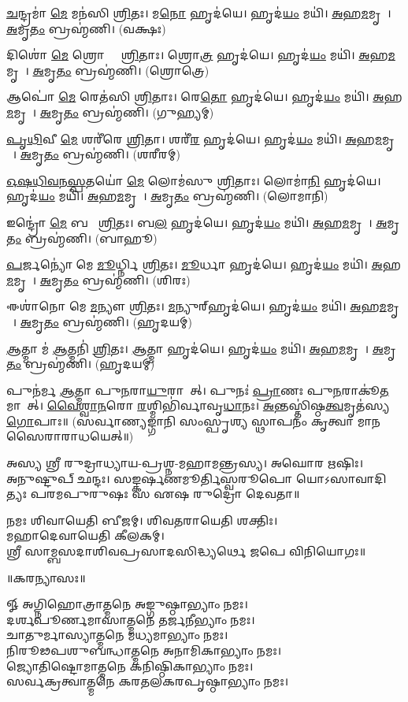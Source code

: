    \ul{𑌚}𑌨𑍍𑌦𑍍𑌰𑌮𑌾॑ \ul{𑌮𑍇} 𑌮𑌨॑𑌸𑌿 \ul{𑌶𑍍𑌰𑌿}𑌤𑌃।   𑌮\ul{𑌨𑍋} 𑌹𑍃𑌦॑𑌯𑍇।   𑌹𑍃𑌦॑\ul{𑌯𑌂} 𑌮𑌯𑌿॑।   \ul{𑌅}𑌹\ul{𑌮}𑌮𑍃𑌤𑍇᳚।   \ul{𑌅}𑌮𑍃\ul{𑌤𑌂} 𑌬𑍍𑌰𑌹𑍍𑌮॑𑌣𑌿। (𑌵𑌕𑍍𑌷𑌃)

   𑌦𑌿𑌶𑍋॑ \ul{𑌮𑍇} 𑌶𑍍𑌰𑍋𑌤𑍍𑌰𑍇᳚ \ul{𑌶𑍍𑌰𑌿}𑌤𑌾𑌃।   𑌶𑍍𑌰𑍋\ul{𑌤𑍍𑌰}\ul{} 𑌹𑍃𑌦॑𑌯𑍇।   𑌹𑍃𑌦॑\ul{𑌯𑌂} 𑌮𑌯𑌿॑।   \ul{𑌅}𑌹\ul{𑌮}𑌮𑍃𑌤𑍇᳚।   \ul{𑌅}𑌮𑍃\ul{𑌤𑌂} 𑌬𑍍𑌰𑌹𑍍𑌮॑𑌣𑌿। (𑌶𑍍𑌰𑍋𑌤𑍍𑌰𑍇)

   𑌆𑌪𑍋॑ \ul{𑌮𑍇} 𑌰𑍇𑌤॑𑌸𑌿 \ul{𑌶𑍍𑌰𑌿}𑌤𑌾𑌃।   𑌰𑍇\ul{𑌤𑍋} 𑌹𑍃𑌦॑𑌯𑍇।   𑌹𑍃𑌦॑\ul{𑌯𑌂} 𑌮𑌯𑌿॑।   \ul{𑌅}𑌹\ul{𑌮}𑌮𑍃𑌤𑍇᳚।   \ul{𑌅}𑌮𑍃\ul{𑌤𑌂} 𑌬𑍍𑌰𑌹𑍍𑌮॑𑌣𑌿। (𑌗𑍁𑌹𑍍𑌯𑌮𑍍)

   \ul{𑌪𑍃}\ul{𑌥𑌿}𑌵𑍀 \ul{𑌮𑍇} 𑌶𑌰𑍀॑𑌰𑍇 \ul{𑌶𑍍𑌰𑌿}𑌤𑌾।   𑌶𑌰𑍀॑\ul{𑌰}\ul{} 𑌹𑍃𑌦॑𑌯𑍇।   𑌹𑍃𑌦॑\ul{𑌯𑌂} 𑌮𑌯𑌿॑।   \ul{𑌅}𑌹\ul{𑌮}𑌮𑍃𑌤𑍇᳚।   \ul{𑌅}𑌮𑍃\ul{𑌤𑌂} 𑌬𑍍𑌰𑌹𑍍𑌮॑𑌣𑌿। (𑌶𑌰𑍀𑌰𑌮𑍍)

   \ul{𑌓}\ul{𑌷}\ul{𑌧𑌿}\ul{𑌵}\ul{𑌨}\ul{𑌸𑍍𑌪}𑌤𑌯𑍋॑ \ul{𑌮𑍇} 𑌲𑍋𑌮॑𑌸𑍁 \ul{𑌶𑍍𑌰𑌿}𑌤𑌾𑌃।   𑌲𑍋𑌮𑌾॑\ul{𑌨𑌿} 𑌹𑍃𑌦॑𑌯𑍇।   𑌹𑍃𑌦॑\ul{𑌯𑌂} 𑌮𑌯𑌿॑।   \ul{𑌅}𑌹\ul{𑌮}𑌮𑍃𑌤𑍇᳚।   \ul{𑌅}𑌮𑍃\ul{𑌤𑌂} 𑌬𑍍𑌰𑌹𑍍𑌮॑𑌣𑌿। (𑌲𑍋𑌮𑌾𑌨𑌿)

   𑌇𑌨𑍍𑌦𑍍𑌰𑍋॑ \ul{𑌮𑍇} 𑌬𑌲𑍇᳚ \ul{𑌶𑍍𑌰𑌿}𑌤𑌃।   𑌬\ul{𑌲}\ul{} 𑌹𑍃𑌦॑𑌯𑍇।   𑌹𑍃𑌦॑\ul{𑌯𑌂} 𑌮𑌯𑌿॑।   \ul{𑌅}𑌹\ul{𑌮}𑌮𑍃𑌤𑍇᳚।   \ul{𑌅}𑌮𑍃\ul{𑌤𑌂} 𑌬𑍍𑌰𑌹𑍍𑌮॑𑌣𑌿। (𑌬𑌾𑌹𑍂)

   \ul{𑌪}𑌰𑍍𑌜𑌨𑍍𑌯𑍋॑ 𑌮𑍇 \ul{𑌮𑍂}𑌰𑍍𑌧𑍍𑌨𑌿 \ul{𑌶𑍍𑌰𑌿}𑌤𑌃।   \ul{𑌮𑍂}𑌰𑍍𑌧𑌾 𑌹𑍃𑌦॑𑌯𑍇।   𑌹𑍃𑌦॑\ul{𑌯𑌂} 𑌮𑌯𑌿॑।   \ul{𑌅}𑌹\ul{𑌮}𑌮𑍃𑌤𑍇᳚।   \ul{𑌅}𑌮𑍃\ul{𑌤𑌂} 𑌬𑍍𑌰𑌹𑍍𑌮॑𑌣𑌿। (𑌶𑌿𑌰𑌃)

   𑌈𑌶𑌾॑𑌨𑍋 𑌮𑍇 \ul{𑌮}𑌨𑍍𑌯𑍗 \ul{𑌶𑍍𑌰𑌿}𑌤𑌃।   \ul{𑌮}𑌨𑍍𑌯𑍁𑌰𑍍‌𑌹𑍃𑌦॑𑌯𑍇।   𑌹𑍃𑌦॑\ul{𑌯𑌂} 𑌮𑌯𑌿॑।    \ul{𑌅}𑌹\ul{𑌮}𑌮𑍃𑌤𑍇᳚।   \ul{𑌅}𑌮𑍃\ul{𑌤𑌂} 𑌬𑍍𑌰𑌹𑍍𑌮॑𑌣𑌿। (𑌹𑍃𑌦𑌯𑌮𑍍)

   \ul{𑌆}𑌤𑍍𑌮𑌾 𑌮॑ \ul{𑌆}𑌤𑍍𑌮𑌨𑌿॑ \ul{𑌶𑍍𑌰𑌿}𑌤𑌃।   \ul{𑌆}𑌤𑍍𑌮𑌾 𑌹𑍃𑌦॑𑌯𑍇।   𑌹𑍃𑌦॑\ul{𑌯𑌂} 𑌮𑌯𑌿॑।   \ul{𑌅}𑌹\ul{𑌮}𑌮𑍃𑌤𑍇᳚।   \ul{𑌅}𑌮𑍃\ul{𑌤𑌂} 𑌬𑍍𑌰𑌹𑍍𑌮॑𑌣𑌿।
(𑌹𑍃𑌦𑌯𑌮𑍍)

   𑌪𑍁𑌨॑𑌰𑍍𑌮 \ul{𑌆}𑌤𑍍𑌮𑌾 𑌪𑍁\ul{𑌨}𑌰𑌾\ul{𑌯𑍁}𑌰𑌾𑌗𑌾᳚𑌤𑍍।   𑌪𑍁𑌨𑌃॑ \ul{𑌪𑍍𑌰𑌾}𑌣𑌃 𑌪𑍁\ul{𑌨}𑌰𑌾𑌕𑍂॑\ul{𑌤}𑌮𑌾𑌗𑌾᳚𑌤𑍍।   \ul{𑌵𑍈}\ul{𑌶𑍍𑌵𑌾}\ul{𑌨}𑌰𑍋 \ul{𑌰}𑌶𑍍𑌮𑌿𑌭𑌿॑𑌰𑍍𑌵𑌾𑌵𑍃\ul{𑌧𑌾}𑌨𑌃।   \ul{𑌅}𑌨𑍍𑌤𑌸𑍍𑌤𑌿॑𑌷𑍍𑌠\ul{𑌤𑍍𑌵}𑌮𑍃𑌤॑𑌸𑍍𑌯 \ul{𑌗𑍋}𑌪𑌾𑌃॥ (𑌸𑌰𑍍𑌵𑌾𑌣𑍍𑌯𑌙𑍍𑌗𑌾𑌨𑌿 𑌸𑌂𑌸𑍍𑌪𑍃𑌶𑍍𑌯 𑌸𑍍𑌥𑌾𑌪𑌨𑌂 𑌕𑍃𑌤𑍍𑌵𑌾 𑌮𑌾𑌨𑌸𑍈𑌰𑌾𑌰𑌾𑌧𑌯𑍇𑌤𑍍॥)
{\closesection}


𑌅𑌸𑍍𑌯 𑌶𑍍𑌰𑍀 𑌰𑍁𑌦𑍍𑌰𑌾𑌧𑍍𑌯𑌾𑌯-𑌪𑍍𑌰𑌶𑍍𑌨-𑌮𑌹𑌾𑌮𑌨𑍍𑌤𑍍𑌰𑌸𑍍𑌯। 𑌅𑌘𑍋𑌰 𑌋𑌷𑌿𑌃।\\
𑌅𑌨𑍁𑌷𑍍𑌟𑍁𑌪𑍍 𑌛𑌨𑍍𑌦𑌃। 𑌸𑌙𑍍𑌕𑌰𑍍𑌷𑌣𑌮𑍂𑌰𑍍𑌤𑌿𑌸𑍍𑌵𑌰𑍂𑌪𑍋 𑌯𑍋𑌽𑌸𑌾𑌵𑌾𑌦𑌿𑌤𑍍𑌯𑌃 𑌪𑌰𑌮𑌪𑍁𑌰𑍁𑌷𑌃 𑌸 𑌏𑌷 𑌰𑍁𑌦𑍍𑌰𑍋 𑌦𑍇𑌵𑌤𑌾॥

𑌨𑌮𑌃 𑌶𑌿𑌵𑌾𑌯𑍇𑌤𑌿 𑌬𑍀𑌜𑌮𑍍। 𑌶𑌿𑌵𑌤𑌰𑌾𑌯𑍇𑌤𑌿 𑌶𑌕𑍍𑌤𑌿𑌃।\\
𑌮𑌹𑌾𑌦𑍇𑌵𑌾𑌯𑍇𑌤𑌿 𑌕𑍀𑌲𑌕𑌮𑍍।\\
𑌶𑍍𑌰𑍀 𑌸𑌾𑌮𑍍𑌬𑌸𑌦𑌾𑌶𑌿𑌵𑌪𑍍𑌰𑌸𑌾𑌦𑌸𑌿𑌦𑍍𑌧𑍍𑌯𑌰𑍍𑌥𑍇 𑌜𑌪𑍇 𑌵𑌿𑌨𑌿𑌯𑍋𑌗𑌃॥\\


\centerline{॥𑌕𑌰𑌨𑍍𑌯𑌾𑌸𑌃॥}
𑍐 𑌅𑌗𑍍𑌨𑌿𑌹𑍋𑌤𑍍𑌰𑌾𑌤𑍍𑌮𑌨𑍇 𑌅𑌙𑍍𑌗𑍁𑌷𑍍𑌠𑌾𑌭𑍍𑌯𑌾𑌂 𑌨𑌮𑌃।\\
𑌦𑌰𑍍𑌶𑌪𑍂𑌰𑍍𑌣𑌮𑌾𑌸𑌾𑌤𑍍𑌮𑌨𑍇 𑌤𑌰𑍍𑌜𑌨𑍀𑌭𑍍𑌯𑌾𑌂 𑌨𑌮𑌃।\\
𑌚𑌾𑌤𑍁𑌰𑍍𑌮𑌾𑌸𑍍𑌯𑌾𑌤𑍍𑌮𑌨𑍇 𑌮𑌧𑍍𑌯𑌮𑌾𑌭𑍍𑌯𑌾𑌂 𑌨𑌮𑌃।\\
𑌨𑌿𑌰𑍂𑌢𑌪𑌶𑍁𑌬𑌨𑍍𑌧𑌾𑌤𑍍𑌮𑌨𑍇 𑌅𑌨𑌾𑌮𑌿𑌕𑌾𑌭𑍍𑌯𑌾𑌂 𑌨𑌮𑌃।\\
𑌜𑍍𑌯𑍋𑌤𑌿𑌷𑍍𑌟𑍋𑌮𑌾𑌤𑍍𑌮𑌨𑍇 𑌕𑌨𑌿𑌷𑍍𑌠𑌿𑌕𑌾𑌭𑍍𑌯𑌾𑌂 𑌨𑌮𑌃।\\
𑌸𑌰𑍍𑌵𑌕𑍍𑌰𑌤𑍍𑌵𑌾𑌤𑍍𑌮𑌨𑍇 𑌕𑌰𑌤𑌲𑌕𑌰𑌪𑍃𑌷𑍍𑌠𑌾𑌭𑍍𑌯𑌾𑌂  𑌨𑌮𑌃।\\


